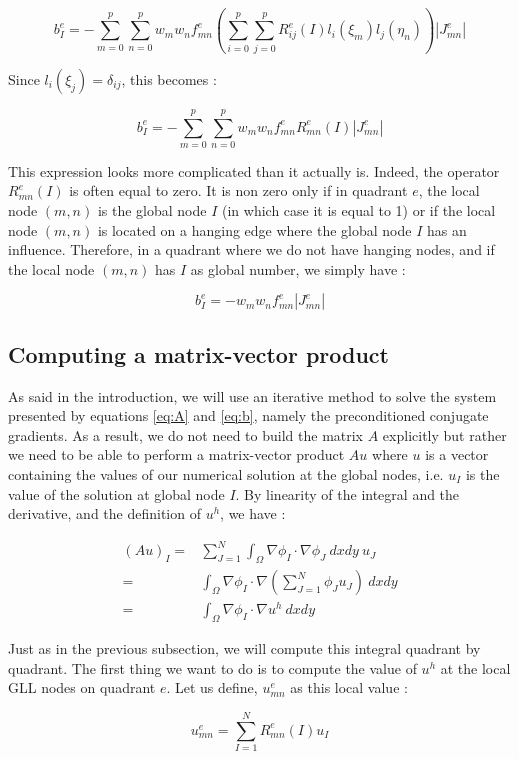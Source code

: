$$ b_I^e = - \sum_{m=0}^p\sum_{n=0}^p w_m w_n f^e_{mn} \left( \sum_{i=0}^p\sum_{j=0}^p R^e_{ij}(I) l_i(\xi_m)l_j(\eta_n) \right) |J^e_{mn}|$$

Since $l_i(\xi_j) = \delta_{ij}$, this becomes : 

$$  b_I^e = - \sum_{m=0}^p\sum_{n=0}^p w_m w_n f^e_{mn} R^e_{mn}(I) |J^e_{mn}|$$

This expression looks more complicated than it actually is. Indeed, the operator $R_{mn}^e(I)$ is often equal to zero. It is non zero only if in quadrant $e$, the local node $(m,n)$ is the global node $I$ (in which case it is equal to 1) or if the local node $(m,n)$ is located on a hanging edge where the global node $I$ has an influence. Therefore, in a quadrant where we do not have hanging nodes, and if the local node $(m,n)$ has $I$ as global number, we simply have : 

$$b_I^e = - w_m w_n f^e_{mn} |J^e_{mn}|$$

\subsection{Computing a matrix-vector product}

As said in the introduction, we will use an iterative method to solve the system presented by equations \ref{eq:A} and \ref{eq:b}, namely the preconditioned conjugate gradients. As a result, we do not need to build the matrix $A$ explicitly but rather we need to be able to perform a matrix-vector product $Au$ where $u$ is a vector containing the values of our numerical solution at the global nodes, i.e. $u_I$ is the value of the solution at global node $I$. By linearity of the integral and the derivative, and the definition of $u^h$, we have : 

\begin{align*}
(Au)_I =& \sum_{J=1}^N \int_\Omega \nabla \phi_I \cdot \nabla \phi_J \:dxdy \: u_J\\
=& \int_\Omega \nabla \phi_I \cdot \nabla\left(\sum_{J=1}^N \phi_Ju_J\right)\:dxdy\\
=& \int_\Omega \nabla \phi_I \cdot \nabla u^h \: dxdy
\end{align*}

Just as in the previous subsection, we will compute this integral quadrant by quadrant. The first thing we want to do is to compute the value of $u^h$ at the local GLL nodes on quadrant $e$. Let us define, $u^e_{mn}$ as this local value : 

$$u^e_{mn} = \sum_{I=1}^N R_{mn}^e(I) u_I$$

